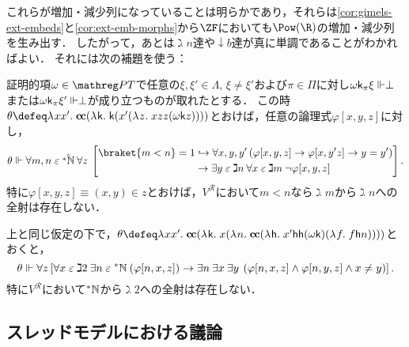 \documentclass[realisability.tex]{subfiles}
\begin{document}
これらが増加・減少列になっていることは明らかであり，それらは\cref{cor:gimels-ext-embeds}と\cref{cor:ext-emb-morphs}から$\ZF$においても$\Pow(\R)$の増加・減少列を生み出す．
したがって，あとは$\gimel n$達や$\downarrow b$達が真に単調であることがわかればよい．
それには次の補題を使う：

\begin{lemma}
 証明的項$\omega \in \PT$で任意の$\xi, \xi' \in \Lambda$, $\xi \neq \xi'$および$\pi \in \Pi$に対し$\omega \mathsf{k}_\pi \xi \Vdash \perp$または$\omega\mathsf{k}_\pi \xi' \Vdash \perp$が成り立つものが取れたとする．
 この時$\theta \defeq \abs{x x'}{\cc (\abs{\conti}{\conti (x'(\abs{z}{xzz(\omega \conti z)}))})}$とおけば，任意の論理式$\varphi[x,y,z]$に対し，
 \[
  \theta \Vdash \forall m, n \strin \hat{\NN}\: \forall z \:
   \left[\begin{split}
          \braket{m < n} = 1 &\hookrightarrow
          \forall x, y, y' \left( \varphi[x,y,z] \to \varphi[x, y' z] \to y = y'\right)\\
         &\to \exists y \strin \gimel n \: \forall x \strin \gimel m \: \neg \varphi[x,y,z]
  \end{split}\right].
 \]
 特に$\varphi[x, y, z] \equiv (x, y) \in z$とおけば，$V^{\mathcal{R}}$において$m < n$なら$\gimel m$から$\gimel n$への全射は存在しない．
\end{lemma}

\begin{lemma}
 上と同じ仮定の下で，$\theta \defeq \abs{x x'}{\cc(\abs{\conti}{x(\abs{n}{\cc(\abs{\mathsf{h}}{x'\mathsf{h}\mathsf{h}(\omega \conti)(\abs{f}{f\mathsf{h}n})})})})}$とおくと，
 \[
 \theta \Vdash \forall z \left[ \forall x \mathrel{\varepsilon} \gimel 2 \: \exists n \mathrel{\varepsilon} \mathord{{}^{*}\mathbb{N}} \: ( \varphi[n, x, z]) \to \exists n\: \exists x\: \exists y\: \left(\varphi[n, x, z] \land  \varphi[n, y, z] \land x \neq y\right)  \right].
 \]
 特に$V^{\mathcal{R}}$において$\mathord{{}^{*}\mathbb{N}}$から$\gimel 2$への全射は存在しない．
\end{lemma}


\subsection{スレッドモデルにおける議論}
\end{document}
